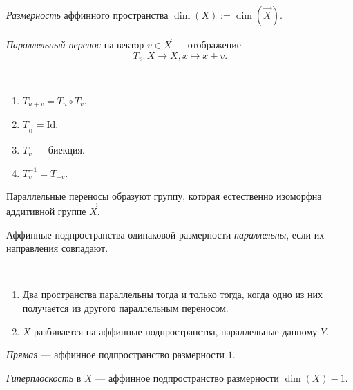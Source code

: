 \documentclass[12pt,a4paper]{article}
\newcommand{\Id}{\ensuremath{\mathrm{Id}}\xspace}
\begin{document}
    \begin{definition}
        \emph{Размерность} аффинного пространства $\dim(X) := \dim(\overrightarrow{X})$.
    \end{definition}

    \begin{definition}
        \emph{Параллельный перенос} на вектор $v \in \overrightarrow{X}$ --- отображение
        \[T_v: X \to X, x \mapsto x + v.\]
    \end{definition}

    \begin{lemma}\ 
        \begin{enumerate}
            \item $T_{u + v} = T_u \circ T_v$.
            \item $T_{\overrightarrow{0}} = \Id$.
            \item $T_v$ --- биекция.
            \item $T_v^{-1} = T_{-v}$.
        \end{enumerate}
    \end{lemma}

    \begin{corollary}
        Параллельные переносы образуют группу, которая естественно изоморфна аддитивной группе $\overrightarrow{X}$.
    \end{corollary}

    \begin{definition}
        Аффинные подпространства одинаковой размерности \emph{параллельны}, если их направления совпадают.
    \end{definition}

    \begin{lemma}\ 
        \begin{enumerate}
            \item Два пространства параллельны тогда и только тогда, когда одно из них получается из другого параллельным переносом.
            \item $X$ разбивается на аффинные подпространства, параллельные данному $Y$.
        \end{enumerate}
    \end{lemma}

    \begin{definition}
        \emph{Прямая} --- аффинное подпространство размерности $1$.

        \emph{Гиперплоскость} в $X$ --- аффинное подпространство размерности $\dim(X) - 1$.
    \end{definition}
\end{document}
